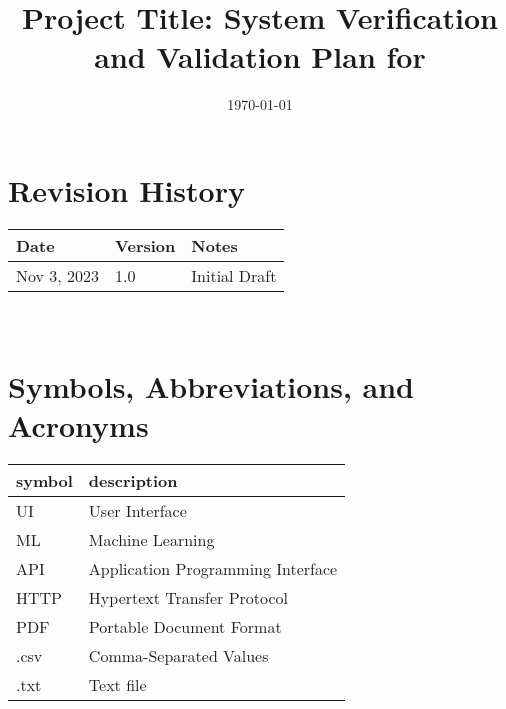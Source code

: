 \documentclass[12pt, titlepage]{article}
\begin{document}
\title{Project Title: System Verification and Validation Plan for \progname{}} 
\author{\authname}
\date{\today}
	
\maketitle


\section*{Revision History}

\begin{tabularx}{\textwidth}{p{3cm}p{2cm}X}
\toprule {\bf Date} & {\bf Version} & {\bf Notes}\\
\midrule
Nov 3, 2023 & 1.0 & Initial Draft\\
\bottomrule
\end{tabularx}

~\\

\newpage

\tableofcontents

\listoftables


\newpage

\section{Symbols, Abbreviations, and Acronyms}

\renewcommand{\arraystretch}{1.2}
\begin{tabular}{l l} 
  \toprule		
  \textbf{symbol} & \textbf{description}\\
  \midrule 
      UI & User Interface \\
      ML & Machine Learning\\
      API & Application Programming Interface\\
      HTTP & Hypertext Transfer Protocol\\
      PDF & Portable Document Format\\
      .csv & Comma-Separated Values \\
      .txt & Text file\\
  \bottomrule
  
\end{tabular}\\


\newpage

\end{document}
